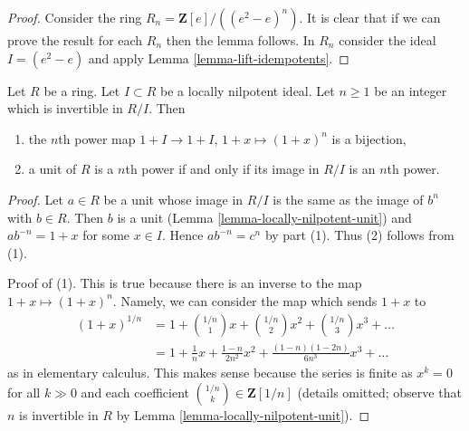 \begin{proof}
Consider the ring $R_n = \mathbf{Z}[e]/((e^2 - e)^n)$. It is clear that
if we can prove the result for each $R_n$ then the lemma follows.
In $R_n$ consider the ideal $I = (e^2 - e)$ and apply
Lemma \ref{lemma-lift-idempotents}.
\end{proof}

\begin{lemma}
\label{lemma-lift-nth-roots}
Let $R$ be a ring. Let $I \subset R$ be a locally nilpotent ideal.
Let $n \geq 1$ be an integer which is invertible in $R/I$. Then
\begin{enumerate}
\item the $n$th power map $1 + I \to 1 + I$, $1 + x \mapsto (1 + x)^n$
is a bijection,
\item a unit of $R$ is a $n$th power if and only if its image in $R/I$
is an $n$th power.
\end{enumerate}
\end{lemma}

\begin{proof}
Let $a \in R$ be a unit whose image in $R/I$ is the same as the image
of $b^n$ with $b \in R$. Then $b$ is a unit
(Lemma \ref{lemma-locally-nilpotent-unit}) and
$ab^{-n} = 1 + x$ for some $x \in I$. Hence $ab^{-n} = c^n$ by
part (1). Thus (2) follows from (1).

\medskip\noindent
Proof of (1). This is true because there is an inverse to the
map $1 + x \mapsto (1 + x)^n$. Namely, we can consider the map
which sends $1 + x$ to
\begin{align*}
(1 + x)^{1/n}
& =
1 + {1/n \choose 1}x +
{1/n \choose 2}x^2 +
{1/n \choose 3}x^3 + \ldots \\
& =
1 + \frac{1}{n} x + \frac{1 - n}{2n^2}x^2 +
\frac{(1 - n)(1 - 2n)}{6n^3}x^3 + \ldots
\end{align*}
as in elementary calculus. This makes sense because the series is finite
as $x^k = 0$ for all $k \gg 0$ and each coefficient
${1/n \choose k} \in \mathbf{Z}[1/n]$ (details omitted; observe that
$n$ is invertible in $R$ by Lemma \ref{lemma-locally-nilpotent-unit}).
\end{proof}






